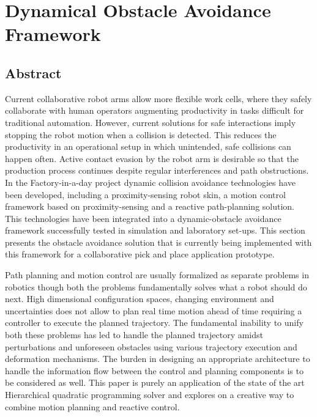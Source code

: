 
\chapter{Dynamical Obstacle Avoidance Framework}
\section{Abstract}

Current collaborative robot arms allow more flexible work cells, where they safely collaborate with human operators augmenting productivity in tasks difficult for traditional automation. However, current solutions for safe interactions imply stopping the robot motion when a collision is detected. This reduces the productivity in an operational setup in which unintended, safe collisions can happen often. Active contact evasion by the robot arm is desirable so that the production process continues despite regular interferences and path obstructions. In the Factory-in-a-day project dynamic collision avoidance technologies have been developed, including a proximity-sensing robot skin, a motion control framework based on proximity-sensing and a reactive path-planning solution. This technologies have been integrated into a dynamic-obstacle avoidance framework successfully tested in simulation and
laboratory set-ups. This section presents the obstacle avoidance solution that is currently being implemented with this framework for a collaborative pick and place application prototype. 

Path planning and motion control are usually formalized as separate problems in robotics though both the problems fundamentally solves what a robot should do next. High dimensional configuration spaces, changing environment and uncertainties does not allow to plan real time motion ahead of time requiring a controller to execute the planned trajectory. The fundamental inability to unify both these problems has led to handle the planned trajectory amidst perturbations and unforeseen obstacles using various trajectory execution and deformation mechanisms. The burden in designing an appropriate architecture to handle the information flow between the control and planning components is to be considered as well. This paper is purely an application of the state of the art Hierarchical quadratic programming solver and explores on a creative way to combine motion planning and reactive control. 




